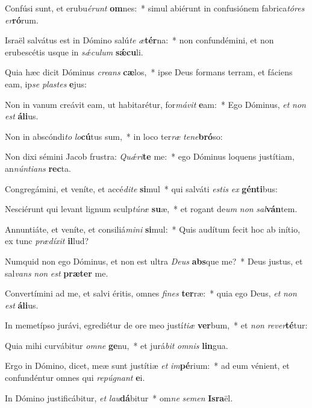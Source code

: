 \item Confúsi sunt, et erubu\textit{é}\textit{runt} \textbf{om}nes:~* simul abiérunt in confusiónem fabrica\textit{tó}\textit{res} \textit{er}\textbf{ró}rum.
\item Israël salvátus est in Dómino salú\textit{te} \textit{æ}\textbf{tér}na:~* non confundémini, et non erubescétis usque in \textit{sǽ}\textit{cu}\textit{lum} \textbf{sǽ}\textbf{cu}li.
\item Quia hæc dicit Dóminus \textit{cre}\textit{ans} \textbf{cæ}los,~* ipse Deus formans terram, et fáciens eam, ip\textit{se} \textit{plas}\textit{tes} \textbf{e}jus:
\item Non in vanum creávit eam, ut habitarétur, for\textit{má}\textit{vit} \textbf{e}am:~* Ego Dóminus, \textit{et} \textit{non} \textit{est} \textbf{á}\textbf{li}us.
\item Non in abscóndi\textit{to} \textit{lo}\textbf{cú}tus sum,~* in loco ter\textit{ræ} \textit{te}\textit{ne}\textbf{bró}so:
\item Non dixi sémini Jacob frustra: \textit{Quǽ}\textit{ri}\textbf{te} me:~* ego Dóminus loquens justítiam, an\textit{nún}\textit{ti}\textit{ans} \textbf{rec}ta.
\item Congregámini, et veníte, et accé\textit{di}\textit{te} \textbf{si}mul~* qui salváti \textit{es}\textit{tis} \textit{ex} \textbf{gén}\textbf{ti}bus:
\item Nesciérunt qui levant lignum sculp\textit{tú}\textit{ræ} \textbf{su}æ,~* et rogant de\textit{um} \textit{non} \textit{sal}\textbf{ván}tem.
\item Annuntiáte, et veníte, et consiliá\textit{mi}\textit{ni} \textbf{si}mul:~* Quis audítum fecit hoc ab inítio, ex tunc \textit{præ}\textit{dí}\textit{xit} \textbf{il}lud?
\item Numquid non ego Dóminus, et non est ultra \textit{De}\textit{us} \textbf{abs}que me?~* Deus justus, et sal\textit{vans} \textit{non} \textit{est} \textbf{præ}\textbf{ter} me.
\item Convertímini ad me, et salvi éritis, omnes \textit{fi}\textit{nes} \textbf{ter}ræ:~* quia ego Deus, \textit{et} \textit{non} \textit{est} \textbf{á}\textbf{li}us.
\item In memetípso jurávi, egrediétur de ore meo justí\textit{ti}\textit{æ} \textbf{ver}bum,~* et \textit{non} \textit{re}\textit{ver}\textbf{té}tur:
\item Quia mihi curvábitur \textit{om}\textit{ne} \textbf{ge}nu,~* et jurá\textit{bit} \textit{om}\textit{nis} \textbf{lin}gua.
\item Ergo in Dómino, dicet, meæ sunt justítiæ \textit{et} \textit{im}\textbf{pé}rium:~* ad eum vénient, et confundéntur omnes qui \textit{re}\textit{pú}\textit{gnant} \textbf{e}i.
\item In Dómino justificábitur, \textit{et} \textit{lau}\textbf{dá}bitur~* om\textit{ne} \textit{se}\textit{men} \textbf{Is}\textbf{ra}ël.
